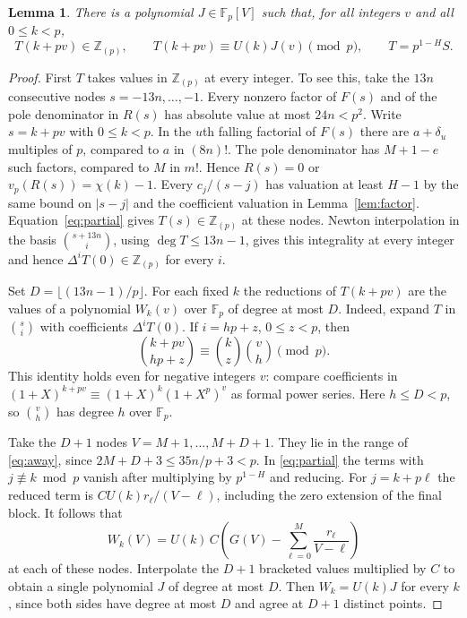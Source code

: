 \documentclass[11pt]{article}
\newtheorem{lemma}[theorem]{Lemma}
\newcommand{\Fp}{\mathbb F_p}
\newcommand{\Zp}{\mathbb Z_{(p)}}
\newcommand{\val}{v_p}
\begin{document}
\begin{lemma}\label{lem:interpolate}
There is a polynomial $J\in\Fp[V]$ such that, for all integers $v$
and all $0\le k<p$,
\[
 T(k+pv)\in\Zp,\qquad T(k+pv)\equiv U(k)J(v)\pmod p,\qquad
 T=p^{1-H}S .
\]
\end{lemma}
\begin{proof}
First $T$ takes values in $\Zp$ at every integer.
To see this, take the $13n$ consecutive nodes $s=-13n,\ldots,-1$.
Every nonzero factor of $F(s)$ and of the pole denominator in $R(s)$
has absolute value at most $24n<p^2$. Write $s=k+pv$ with $0\le k<p$.
In the $u$th falling factorial of $F(s)$ there are $a+\delta_u$
multiples of $p$, compared to $a$ in $(8n)!$.
The pole denominator has $M+1-e$ such factors, compared to $M$ in $m!$.
Hence $R(s)=0$ or $\val(R(s))=\chi(k)-1$.
Every $c_j/(s-j)$ has valuation at least $H-1$ by the same bound
on $|s-j|$ and the coefficient valuation in Lemma~\ref{lem:factor}.
Equation~\eqref{eq:partial} gives $T(s)\in\Zp$ at these nodes.
Newton interpolation in the basis $\binom{s+13n}{i}$, using
$\deg T\le13n-1$, gives this integrality
at every integer and hence $\Delta^iT(0)\in\Zp$ for every $i$.

Set $D=\lfloor(13n-1)/p\rfloor$. For each fixed $k$ the reductions
of $T(k+pv)$ are the values of a polynomial $W_k(v)$ over $\Fp$
of degree at most $D$. Indeed, expand $T$ in
$\binom{s}{i}$ with coefficients $\Delta^iT(0)$. If $i=hp+z$,
$0\le z<p$, then
\[
 \binom{k+pv}{hp+z}\equiv\binom kz\binom vh\pmod p .
\]
This identity holds even for negative integers $v$: compare
coefficients in $(1+X)^{k+pv}\equiv(1+X)^k(1+X^p)^v$ as formal
power series. Here $h\le D<p$, so $\binom vh$ has degree $h$ over
$\Fp$.

Take the $D+1$ nodes $V=M+1,\ldots,M+D+1$. They lie in the range
of \eqref{eq:away}, since $2M+D+3\le35n/p+3<p$.
In \eqref{eq:partial} the terms with $j\not\equiv k\bmod p$ vanish
after multiplying by $p^{1-H}$ and reducing. For $j=k+p\ell$ the
reduced term is $C U(k)r_\ell/(V-\ell)$, including the zero extension
of the final block. It follows that
\[
 W_k(V)=U(k)\, C\left(G(V)-\sum_{\ell=0}^M\frac{r_\ell}{V-\ell}\right)
\]
at each of these nodes. Interpolate the $D+1$ bracketed values
multiplied by $C$ to obtain a single polynomial $J$ of degree at most
$D$. Then $W_k=U(k)J$ for every $k$, since both sides have degree
at most $D$ and agree at $D+1$ distinct points.
\end{proof}
\end{document}
